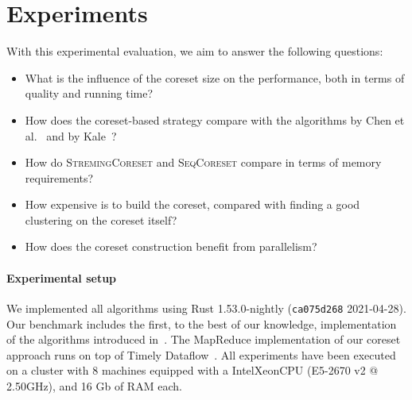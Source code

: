 \section{Experiments}

\newcommand{\mc}[1]{{\color{red} --- MC: #1 ---}}

\graphicspath{{../imgs/}}

\newcommand{\data}[1]{\texttt{#1}}
\newcommand{\higgs}{\texttt{Higgs}\xspace}
\newcommand{\phones}{\texttt{Phones}\xspace}
\newcommand{\wiki}{\texttt{Wiki}\xspace}
\newcommand{\chen}{\textsc{ChenEtAl}\xspace}
\newcommand{\seq}{\textsc{SeqCoreset}\xspace}
\newcommand{\stream}{\textsc{StremingCoreset}\xspace}
\newcommand{\mapr}{\textsc{MRCoreset}\xspace}
\newcommand{\kale}{\textsc{KaleStream}\xspace}

With this experimental evaluation, we aim to answer the following questions:
\begin{itemize}
    \item What is the influence of the coreset size on the performance, 
        both in terms of quality and running time?
    \item How does the coreset-based strategy compare with the algorithms
        by Chen et al.~\cite{DBLP:journals/algorithmica/ChenLLW16}
        and by Kale~\cite{DBLP:conf/approx/Kale19}?
    \item How do \stream and \seq compare in terms of memory requirements?
    \item How expensive is to build the coreset, compared with finding
        a good clustering on the coreset itself?
    \item How does the coreset construction benefit from parallelism?
\end{itemize}

\paragraph*{Experimental setup}
We implemented all algorithms using Rust 1.53.0-nightly (\texttt{ca075d268} 2021-04-28).
Our benchmark includes the first, to the best of our knowledge, implementation of the algorithms 
introduced in~\cite{DBLP:journals/algorithmica/ChenLLW16,DBLP:conf/approx/Kale19}.
The MapReduce implementation of our coreset approach runs on top of Timely Dataflow~\cite{DBLP:journals/cacm/MurrayMIIBA16}.
All experiments have been executed on a cluster with 8 machines equipped
with a Intel\textregistered Xeon\textregistered CPU (E5-2670 v2 @ 2.50GHz), and 16 Gb of RAM each.

